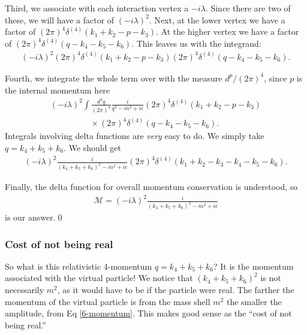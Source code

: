 \documentclass{book}
\theoremstyle{definition}
\newcommand{\f}[2]{\frac{#1}{#2}}
\newcommand{\lp}{\left(}
\newcommand{\rp}{\right)}
\begin{document}
Third, we associate with each interaction vertex a $-i\lambda$. Since there are two of these, we will have a factor of $(-i\lambda)^2$. Next, at the lower vertex we have a factor of $(2\pi)^4\delta^{(4)}\lp k_1 + k_2 - p - k_3 \rp$. At the higher vertex we have a factor of $(2\pi)^4\delta^{(4)}\lp q - k_4 - k_5 - k_6 \rp$. This leaves us with the integrand:
\begin{align}
(-i\lambda)^2 (2\pi)^4\delta^{(4)}\lp k_1 + k_2 - p - k_3 \rp (2\pi)^4\delta^{(4)}\lp q - k_4 - k_5 - k_6 \rp.
\end{align}

Fourth, we integrate the whole term over with the measure $d^p/(2\pi)^4$, since $p$ is the internal momentum here
\begin{align}
(-i\lambda)^2\int \f{d^4 q}{(2\pi)^4} \f{i}{q^2 - m^2 + i\epsilon} (2\pi)^4\delta^{(4)}\lp k_1 + k_2 - p - k_3 \rp \nonumber\\
\hspace{2cm}\times(2\pi)^4\delta^{(4)}\lp q - k_4 - k_5 - k_6 \rp.
\end{align}
Integrals involving delta functions are \textit{very} easy to do. We simply take $q = k_4 + k_5 + k_6$. We should get
\begin{align}
(-i\lambda)^2 \f{i}{(k_4 + k_5 + k_6)^2 - m^2 + i\epsilon} (2\pi)^4\delta^{(4)}(k_1 + k_2 - k_3 - k_4 - k_5 - k_6). 
\end{align}

Finally, the delta function for overall momentum conservation is understood, so 
\begin{align}\label{6-momentum}
\mathcal{M} = (-i\lambda)^2 \f{i}{(k_4 + k_5 + k_6)^2 - m^2 + i\epsilon}
\end{align}
is our answer.\qed











\subsubsection{Cost of not being real}

So what is this relativistic 4-momentum $q = k_4 + k_5 + k_6$? It is the momentum associated with the virtual particle! We notice that $(k_4 + k_5 + k_6)^2$ is not necessarily $m^2$, as it would have to be if the particle were real. The farther the momentum of the virtual particle is from the mass shell $m^2$ the smaller the amplitude, from Eq \eqref{6-momentum}. This makes good sense as the ``cost of not being real.''\\
\end{document}
